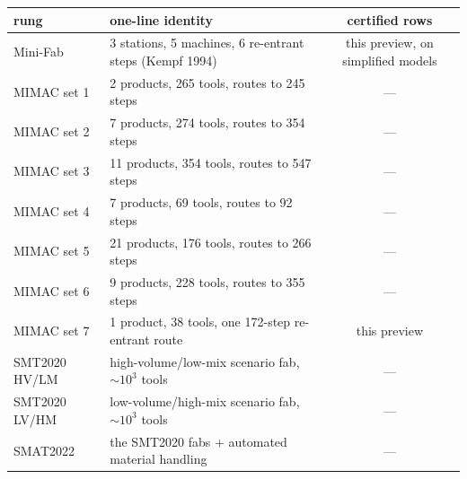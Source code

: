\begin{center}\small
\begin{tabular}{@{}llc@{}}
\toprule
rung & one-line identity & certified rows\\
\midrule
Mini-Fab & 3 stations, 5 machines, 6 re-entrant steps (Kempf 1994) &
  this preview, on simplified models\\
MIMAC set 1 & 2 products, 265 tools, routes to 245 steps & ---\\
MIMAC set 2 & 7 products, 274 tools, routes to 354 steps & ---\\
MIMAC set 3 & 11 products, 354 tools, routes to 547 steps & ---\\
MIMAC set 4 & 7 products, 69 tools, routes to 92 steps & ---\\
MIMAC set 5 & 21 products, 176 tools, routes to 266 steps & ---\\
MIMAC set 6 & 9 products, 228 tools, routes to 355 steps & ---\\
MIMAC set 7 & 1 product, 38 tools, one 172-step re-entrant route &
  this preview\\
SMT2020 HV/LM & high-volume/low-mix scenario fab, $\sim\!10^3$ tools & ---\\
SMT2020 LV/HM & low-volume/high-mix scenario fab, $\sim\!10^3$ tools & ---\\
SMAT2022 & the SMT2020 fabs + automated material handling & ---\\
\bottomrule
\end{tabular}
\end{center}

\medskip

